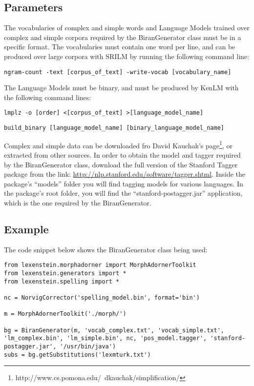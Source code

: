 \subsection{Parameters}

The vocabularies of complex and simple words and Language Models trained over complex and simple corpora required by the BiranGenerator class must be in a specific format. The vocabularies must contain one word per line, and can be produced over large corpora with SRILM by running the following command line:

\begin{lstlisting}
ngram-count -text [corpus_of_text] -write-vocab [vocabulary_name]
\end{lstlisting}

The Language Models must be binary, and must be produced by KenLM with the following command lines:

\begin{lstlisting}
lmplz -o [order] <[corpus_of_text] >[language_model_name]
\end{lstlisting}
\begin{lstlisting}
build_binary [language_model_name] [binary_language_model_name]
\end{lstlisting}

Complex and simple data can be downloaded fro David Kauchak's page\footnote{http://www.cs.pomona.edu/~dkauchak/simplification/}, or extracted from other sources. In order to obtain the model and tagger required by the BiranGenerator class, download the full version of the Stanford Tagger package from the link: \url{http://nlp.stanford.edu/software/tagger.shtml}. Inside the package's ``models'' folder you will find tagging models for various languages. In the package's root folder, you will find the ``stanford-postagger.jar'' application, which is the one required by the BiranGenerator.

\subsection{Example}

The code snippet below shows the BiranGenerator class being used:

\begin{lstlisting}
from lexenstein.morphadorner import MorphAdornerToolkit
from lexenstein.generators import *
from lexenstein.spelling import *

nc = NorvigCorrector('spelling_model.bin', format='bin')

m = MorphAdornerToolkit('./morph/')

bg = BiranGenerator(m, 'vocab_complex.txt', 'vocab_simple.txt', 'lm_complex.bin', 'lm_simple.bin', nc, 'pos_model.tagger', 'stanford-postagger.jar', '/usr/bin/java')
subs = bg.getSubstitutions('lexmturk.txt')
\end{lstlisting}